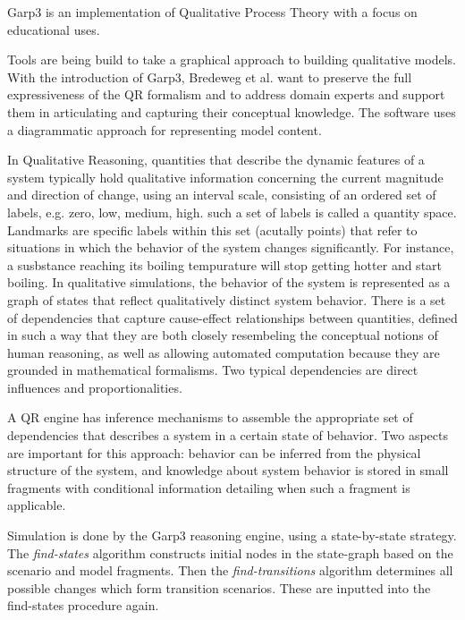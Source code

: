 \documentclass{article} %
\begin{document}
Garp3\cite{bredeweg-garp} is an implementation of Qualitative Process Theory with a focus on
educational uses.

Tools are being build to take a graphical approach to building qualitative 
models. With the introduction of Garp3, Bredeweg et al. want to preserve the
full expressiveness of the QR formalism and to address domain experts and
support them in articulating and capturing their conceptual knowledge. The
software uses a diagrammatic approach for representing model content.

In Qualitative Reasoning, quantities that describe the dynamic features of a 
system typically hold qualitative information concerning the current magnitude 
and direction of change, using an interval scale, consisting of an ordered set 
of labels, e.g. {zero, low, medium, high}. such a set of labels
is called a quantity space. Landmarks are specific labels within this set
(acutally points) that refer to situations in which the behavior of the system
changes significantly. For instance, a susbstance reaching its boiling
tempurature will stop getting hotter and start boiling. In qualitative
simulations, the behavior of the system is represented as a graph of states
that reflect qualitatively distinct system behavior. There is a set of
dependencies that capture cause-effect relationships between quantities,
defined in such a way that they are both closely resembeling the conceptual
notions of human reasoning, as well as allowing automated computation because
they are grounded in mathematical formalisms. Two typical dependencies are
direct influences and proportionalities.

A QR engine has inference mechanisms to assemble the appropriate set of
dependencies that describes a system in a certain state of behavior. Two
aspects are important for this approach: behavior can be inferred from the
physical structure of the system, and knowledge about system behavior is
stored in small fragments with conditional information detailing when such a
fragment is applicable.

\vspace{0.8em}

Simulation is done by the Garp3 reasoning engine, using a state-by-state
strategy. The \emph{find-states} algorithm constructs initial nodes in the 
state-graph based on the scenario and model fragments. Then the 
\emph{find-transitions} algorithm determines all possible changes which form 
transition scenarios. These are inputted into the find-states procedure again.  
\end{document}
